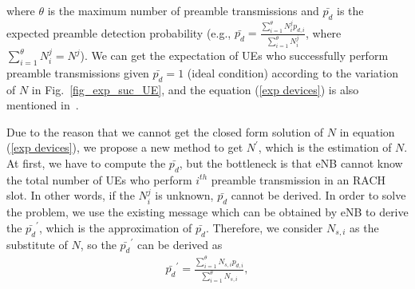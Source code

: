      where $\theta$ is the maximum number of preamble transmissions and $\bar{p_d}$ is the expected preamble detection probability (e.g., $\bar{p_d} = \frac{\sum_{i=1}^{\theta} N_i^j p_{d,i}}{\sum_{i=1}^{\theta}N_i^j}$, where $\sum_{i=1}^{\theta}N_i^j=N^j$). We can get the expectation of UEs who successfully perform preamble transmissions given $\bar{p_d}=1 $ (ideal condition) according to the variation of $N$ in Fig.~\ref{fig_exp_suc_UE}, and the equation (\ref{exp devices}) is also mentioned in~\cite{lin2015estimation}.%


     Due to the reason that we cannot get the closed form solution of $N$ in equation (\ref{exp devices}), we propose a new method to get $N^\prime$, which is the estimation of $N$. At first, we have to compute the $\bar{p_d}$, but the bottleneck is that eNB cannot know the total number of UEs who perform $i^{th}$ preamble transmission in an RACH slot. In other words, if the $N^j_i$ is unknown, $\bar{p_d}$ cannot be derived. In order to solve the problem, we use the existing message which can be obtained by eNB to derive the $\bar{p_d}^\prime$, which is the approximation of $\bar{p_d}$. Therefore, we consider $N_{s,i}$ as the substitute of $N$, so the $\bar{p_d}^\prime$ can be derived as
     \begin{align}
         \bar{p_{d}}^\prime = \frac{\sum_{i=1}^{\theta} N_{s,i} p_{d,i} }{\sum_{i=1}^{\theta}{N_{s,i}}},
     \end{align}


